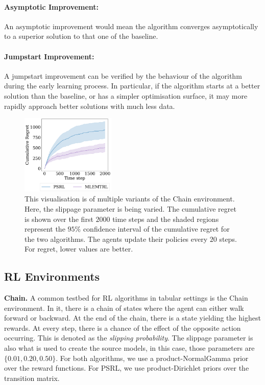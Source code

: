  \paragraph{Asymptotic Improvement:}
 An asymptotic improvement would mean the algorithm converges asymptotically to a superior solution to that one of the baseline.
\paragraph{Jumpstart Improvement:}
A jumpstart improvement can be verified by the behaviour of the algorithm during the early learning process. In particular, if the algorithm starts at a better solution than the baseline, or has a simpler optimisation surface, it may more rapidly approach better solutions with much less data.
\begin{figure}[t!]
    \centering
    \includegraphics[width=0.4\textwidth]{img/chain_experiment.pdf}
    \caption{This visualisation is of multiple variants of the Chain environment. Here, the slippage parameter is being varied. The cumulative regret is shown over the first $2000$ time steps and the shaded regions represent the $95\%$ confidence interval of the cumulative regret for the two algorithms. The agents update their policies every $20$ steps. For regret, lower values are better.}\label{fig:chain}\vspace*{-1em}
\end{figure}
\subsection{RL Environments}
\noindent\textbf{Chain.} A common testbed for RL algorithms in tabular settings is the Chain~\citep{dearden1998bayesian} environment. In it, there is a chain of states where the agent can either walk forward or backward. At the end of the chain, there is a state yielding the highest rewards. At every step, there is a chance of the effect of the opposite action occurring. This is denoted as the \emph{slipping probability}. The slippage parameter is also what is used to create the source models, in this case, those parameters are $\{0.01, 0.20, 0.50\}$. For both algorithms, we use a product-NormalGamma prior over the reward functions. For PSRL, we use product-Dirichlet priors over the transition matrix.

